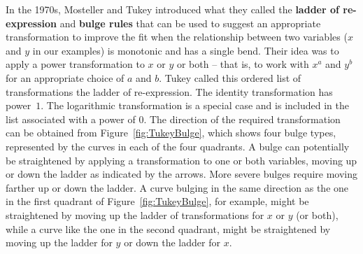\documentclass[twoside]{book}\usepackage[]{graphicx}\usepackage[]{xcolor}
\def\term#1{\textbf{#1}}
\newcounter{example}[section]
\begin{document}
In the 1970s, Mosteller and Tukey introduced what they called
the \term{ladder of re-expression} and \term{bulge rules} 
\cite{Tukey:1977:EDA,Mosteller:1977:DataAnalysis} that can be used to 
suggest an appropriate transformation to improve the fit when the 
relationship between two variables ($x$ and $y$ in our examples) 
is monotonic and has a single bend.  
Their idea was to apply a power transformation to 
$x$ or $y$ or both -- that is, to work with $x^a$ and $y^b$ for
an appropriate choice of $a$ and $b$.  Tukey called 
this ordered list of transformations the ladder of re-expression.
The identity transformation has power~$1$.
The logarithmic transformation is a special case and is included in the 
list associated with a power of $0$.  
The direction of the required transformation can be obtained
from Figure~\ref{fig:TukeyBulge}, which shows four bulge types,
represented by the curves in each of the four quadrants.  
A bulge can potentially be straightened by 
applying a transformation to one or both variables, moving up 
or down the ladder as indicated by the arrows.  More severe bulges
require moving farther up or down the ladder.  
%
A curve bulging in the 
same direction as the one in the first quadrant of Figure~\ref{fig:TukeyBulge},
for example, might be straightened by moving up the ladder of transformations
for $x$ or $y$ (or both), while a curve like the one in the second quadrant, 
might be straightened by moving up the ladder for $y$ or down the ladder for $x$.
\end{document}
